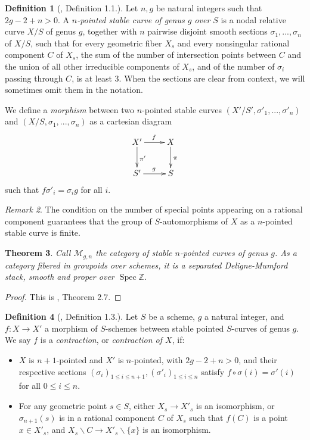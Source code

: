\documentclass[a4paper,12pt]{amsart} %
\numberwithin{equation}{subsection}
\def\ZZ{\mathbb Z}
\newcommand{\Spec}{\operatorname{Spec}}
\theoremstyle{definition}
\newtheorem{definition}{Definition}[section]
\theoremstyle{plain}%
\newtheorem{theorem}[definition]{Theorem}
\theoremstyle{remark}
\newtheorem{remark}[definition]{Remark}
\begin{document}
\begin{definition}[\cite{Knudsen}, Definition 1.1.]
Let $n,g$ be natural integers such that $2g-2+n>0$. A \emph{$n$-pointed stable curve of genus $g$ over $S$} is a nodal relative curve $X/S$ of genus $g$, together with $n$ pairwise disjoint smooth sections $\sigma_1,...,\sigma_n$ of $X/S$, such that for every geometric fiber $X_s$ and every nonsingular rational component $C$ of $X_s$, the sum of the number of intersection points between $C$ and the union of all other irreducible components of $X_s$, and of the number of $\sigma_i$ passing through $C$, is at least $3$. When the sections are clear from context, we will sometimes omit them in the notation.

We define a \emph{morphism} between two $n$-pointed stable curves $(X'/S',\sigma'_1,...,\sigma'_n)$ and $(X/S,\sigma_1,...,\sigma_n)$ as a cartesian diagram
\[
\xymatrix{
X'\ar[r]^f\ar[d]^{\pi'}&X\ar[d]^\pi\\
S'\ar[r]^g&S
}
\]
such that $f\sigma'_i=\sigma_ig$ for all $i$.
\end{definition}

\begin{remark}
The condition on the number of special points appearing on a rational component guarantees that the group of $S$-automorphisms of $X$ as a $n$-pointed stable curve is finite.
\end{remark}


\begin{theorem}
Call $\mathcal{M}_{g,n}$ the category of stable $n$-pointed curves of genus $g$. As a category fibered in groupoids over schemes, it is a separated Deligne-Mumford stack, smooth and proper over $\Spec\ZZ$.
\end{theorem}

\begin{proof}
This is \cite{Knudsen}, Theorem 2.7.
\end{proof}


\begin{definition}[\cite{Knudsen}, Definition 1.3.]
Let $S$ be a scheme, $g$ a natural integer, and $f:X\to X'$ a morphism of $S$-schemes between stable pointed $S$-curves of genus $g$. We say $f$ is a \emph{contraction}, or \emph{contraction of $X$}, if:
\begin{itemize}
\item $X$ is $n+1$-pointed and $X'$ is $n$-pointed, with $2g-2+n>0$, and their respective sections $(\sigma_i)_{1\leq i\leq n+1}, (\sigma'_i)_{1\leq i\leq n}$ satisfy $f\circ\sigma(i)=\sigma'(i)$ for all $0\leq i\leq n$.
\item For any geometric point $s\in S$, either $X_s\to X'_s$ is an isomorphism, or $\sigma_{n+1}(s)$ is in a rational component $C$ of $X_s$ such that $f(C)$ is a point $x\in X'_s$, and $X_s\backslash C\to X'_s\backslash\{x\}$ is an isomorphism.
\end{itemize}
\end{definition}
\end{document}
